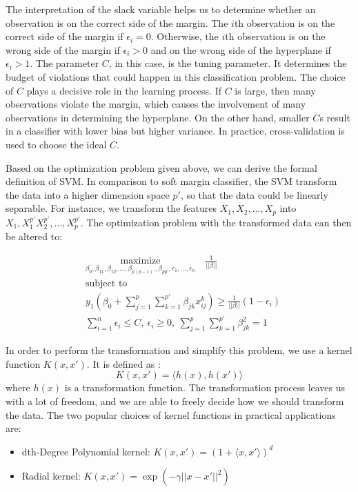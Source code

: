 The interpretation of the slack variable helps us to determine whether an observation is on the correct side of the margin.
The $i$th observation is on the correct side of the margin if $\epsilon_i = 0$. Otherwise, 
the $i$th observation is on the wrong side of the margin if $\epsilon_i > 0$ and on the wrong side of the hyperplane
if $\epsilon_i > 1$. The parameter $C$, in this case, is the tuning parameter. It determines the budget of violations
that could happen in this classification problem. The choice of $C$ plays a decisive role in the learning process.
If $C$ is large, then many observations violate the margin, which causes the involvement of many observations in 
determining the hyperplane. On the other hand, smaller $C$s result in a classifier with lower bias but higher variance.
In practice, cross-validation is used to choose the ideal $C$. 

Based on the optimization problem given above, we can derive the formal definition of SVM. In comparison to 
soft margin classifier, the SVM transform the data into a higher dimension space $p'$, so that the data could be
linearly separable. For instance, we transform the features $X_1, X_2, ..., X_p$ into $X_1, X_1^{p'} X_2^{p'}, ..., X_p^{p'}$.
The optimization problem with the transformed data can then be altered to\cite{R9}: 

\begin{equation}
    \begin{aligned}
      & \underset{\textstyle {\beta_0, \beta_{11}, \beta_{12}, ..., \beta_{p(p-1)'}, \beta_{pp'}, \epsilon_1, ..., \epsilon_n}}{\text{maximize}} \quad
        \frac 1 {||\beta||}\\
      & \text{subject to} \\
      & y_1(\beta_0 + \sum_{j=1}^p \sum_{k=1}^{p'} \beta_{jk}x_{ij}^k )\geq \frac{1}{||\beta||} (1-\epsilon_i) \\
      & \sum_{i=1}^n\epsilon_i \leq C,\  \epsilon_i \geq 0, \ \sum_{j=1}^p\sum_{k=1}^{p'}\beta_{jk}^2 = 1
    \end{aligned}
\end{equation}

In order to perform the transformation and simplify this problem, we use a kernel function $K(x, x')$. It is defined as \cite{Elements12}:
\begin{equation}
    K(x, x') = \langle h(x), h(x') \rangle
\end{equation}
where $h(x)$ is a transformation function. 
The transformation process leaves us with a lot of freedom, and we are able to freely decide how we should transform the
data. The two popular choices of kernel functions in practical applications are:
\begin{itemize}
    \item dth-Degree Polynomial kernel: $K(x, x') = (1 + \langle x, x' \rangle)^d$
    \item Radial kernel: $K(x, x') = \exp(-\gamma ||x - x'||^2)$
\end{itemize}

